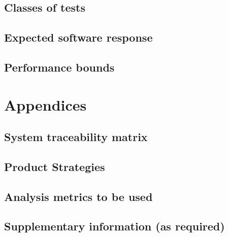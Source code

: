 \documentclass{article}
\begin{document}
\subsection{Classes of tests}

\subsection{Expected software response}

\subsection{Performance bounds}

\section{Appendices}

\subsection{System traceability matrix}

\subsection{Product Strategies}

\subsection{Analysis metrics to be used}

\subsection{Supplementary information (as required)}
\end{document}
